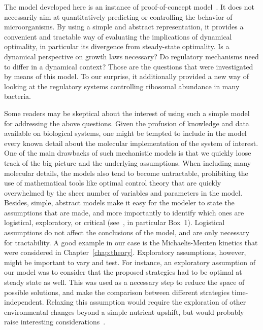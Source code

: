 The model developed here is an instance of proof-of-concept model~\cite{servedio_not_2014}.
It does not necessarily aim at quantitatively predicting or controlling the behavior of microorganisms.
By using a simple and abstract representation, it provides a convenient and tractable way of evaluating the implications of dynamical optimality, in particular its divergence from steady-state optimality.
Is a dynamical perspective on growth laws necessary?
Do regulatory mechanisms need to differ in a dynamical context?
Those are the questions that were investigated by means of this model. 
To our surprise, it additionally provided a new way of looking at the regulatory systems controlling ribosomal abundance in many bacteria.

Some readers may be skeptical about the interest of using such a simple model for addressing the above questions.
Given the profusion of knowledge and data available on biological systems, one might be tempted to include in the model every known detail about the molecular implementation of the system of interest.
One of the main drawbacks of such mechanistic models is that we quickly loose track of the big picture and the underlying assumptions.
When including many molecular details, the models also tend to become untractable, prohibiting the use of mathematical tools like optimal control theory that are quickly overwhelmed by the sheer number of variables and parameters in the model.
Besides, simple, abstract models make it easy for the modeler to state the assumptions that are made, and more importantly to identify which ones are logistical, exploratory, or critical (see~\cite{servedio_not_2014}, in particular Box~1).
Logistical assumptions do not affect the conclusions of the model, and are only necessary for tractability.
A good example in our case is the Michaelis-Menten kinetics that were considered in Chapter~\ref{chap:theory}.
Exploratory assumptions, however, might be important to vary and test.
For instance, an exploratory assumption of our model was to consider that the proposed strategies had to be optimal at steady state as well.
This was used as a necessary step to reduce the space of possible solutions, and make the comparison between different strategies time-independent.
Relaxing this assumption would require the exploration of other environmental changes beyond a simple nutrient upshift, but would probably raise interesting considerations~\cite{geisel_constitutive_2011,lopez-maury_tuning_2008,lambert_memory_2014,kussell_phenotypic_2005}.

